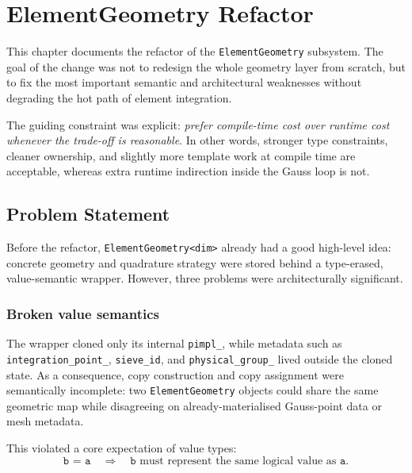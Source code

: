 
\chapter{ElementGeometry Refactor}
\label{ch:element_geometry_refactor}

This chapter documents the refactor of the \texttt{ElementGeometry} subsystem.
The goal of the change was not to redesign the whole geometry layer from
scratch, but to fix the most important semantic and architectural weaknesses
without degrading the hot path of element integration.

The guiding constraint was explicit:
\emph{prefer compile-time cost over runtime cost whenever the trade-off is
reasonable}.  In other words, stronger type constraints, cleaner ownership,
and slightly more template work at compile time are acceptable, whereas extra
runtime indirection inside the Gauss loop is not.


\section{Problem Statement}
\label{sec:eg_problem_statement}

Before the refactor, \texttt{ElementGeometry<dim>} already had a good high-level
idea: concrete geometry and quadrature strategy were stored behind a
type-erased, value-semantic wrapper.  However, three problems were
architecturally significant.

\subsection{Broken value semantics}

The wrapper cloned only its internal \texttt{pimpl\_}, while metadata such as
\texttt{integration\_point\_}, \texttt{sieve\_id}, and
\texttt{physical\_group\_} lived outside the cloned state.  As a consequence,
copy construction and copy assignment were semantically incomplete: two
\texttt{ElementGeometry} objects could share the same geometric map while
disagreeing on already-materialised Gauss-point data or mesh metadata.

This violated a core expectation of value types:
\[
\texttt{b = a} \quad \Longrightarrow \quad \texttt{b} \text{ must represent the same logical value as } \texttt{a}.
\]

